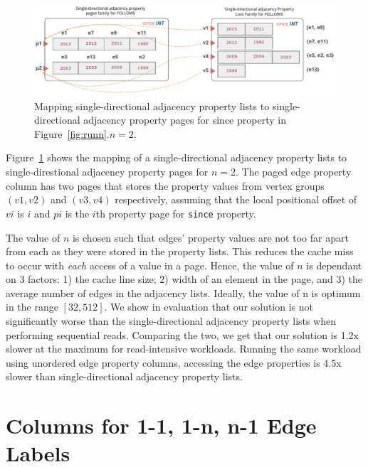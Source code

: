 \begin{figure}
	\vspace{-40pt}
	\hfill\includegraphics[scale=0.78]{img/paged}\hspace*{\fill}
	\captionsetup{justification=centering}
	\caption{Mapping single-directional adjacency property lists to single-directional adjacency property pages for since property in Figure~\ref{fig:runn}.$n=2$.}
	\label{fig:paged}
	\vspace{-5pt}
\end{figure}

Figure~\ref{fig:paged} shows the mapping of a single-directional adjacency property lists to single-direstional adjacency property pages for $n=2$. The paged edge property column has two pages that stores the property values from vertex groups $(v1,v2)$ and $(v3,v4)$ respectively, assuming that the local positional offset of $vi$ is $i$ and $pi$ is the $i$th property page for \texttt{since} property. 

The value of $n$ is chosen such that edges' property values are not too far apart from each as they were stored in the property lists. This reduces the cache miss to occur with \emph{each} access of a value in a page. Hence, the value of $n$ is dependant on 3 factors: 1) the cache line size; 2) width of an element in the page, and 3) the average number of edges in the adjacency lists. Ideally, the value of n is optimum in the range $[32, 512]$. We show in evaluation that our solution is not significantly worse than the single-directional adjacency property lists when performing sequential reads. Comparing the two, we get that our solution is 1.2x slower at the maximum for read-intensive workloads. Running the same workload using unordered edge property columns, accessing the edge properties is 4.5x slower than single-directional adjacency property lists.

\section{Columns for 1-1, 1-n, n-1 Edge Labels}
\label{sec:single-cardinality-cols}

